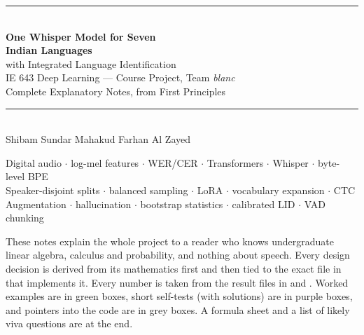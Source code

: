 \documentclass[11pt,a4paper]{report}
\newcommand{\file}[1]{\texttt{\detokenize{#1}}}
\newcommand{\1}{\mathbb{1}}
\begin{document}
\begin{titlepage}
\centering
\vspace*{2.5cm}
{\color{titleblue}\rule{\linewidth}{1pt}}\\[14pt]
{\Huge\bfseries One Whisper Model for Seven\\[6pt] Indian Languages\\[10pt]}
{\Large with Integrated Language Identification\\[10pt]}
{\large IE 643 Deep Learning --- Course Project, Team \emph{blanc}\\[4pt]
Complete Explanatory Notes, from First Principles}\\[14pt]
{\color{titleblue}\rule{\linewidth}{1pt}}\\[1.2cm]

{\large Shibam Sundar Mahakud \quad\textbullet\quad Farhan Al Zayed}\\[1.2cm]

\begin{minipage}{0.86\linewidth}\centering
Digital audio $\cdot$ log-mel features $\cdot$ WER/CER $\cdot$ Transformers $\cdot$ Whisper $\cdot$ byte-level BPE\\
Speaker-disjoint splits $\cdot$ balanced sampling $\cdot$ LoRA $\cdot$ vocabulary expansion $\cdot$ CTC\\
Augmentation $\cdot$ hallucination $\cdot$ bootstrap statistics $\cdot$ calibrated LID $\cdot$ VAD chunking
\end{minipage}

\vspace{1.4cm}
\begin{minipage}{0.78\linewidth}\small
These notes explain the whole project to a reader who knows undergraduate linear algebra, calculus and
probability, and nothing about speech. Every design decision is derived from its mathematics first and then tied to the exact
file in \file{src/} that implements it. Every number is taken from the result files in \file{reports/} and \file{runs/}.
Worked examples are in green boxes, short self-tests (with solutions) are in purple boxes, and pointers into the code are in grey boxes.
A formula sheet and a list of likely viva questions are at the end.
\end{minipage}


\end{titlepage}
\end{document}
